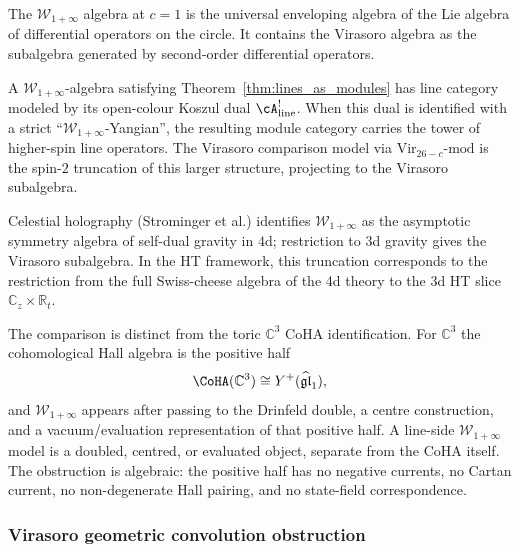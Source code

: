 \begin{remark}
\label{rem:virasoro-w-infinity}
The $\mathcal{W}_{1+\infty}$ algebra at $c = 1$ is the universal
enveloping algebra of the Lie algebra of differential operators on
the circle. It contains the Virasoro algebra as the subalgebra
generated by second-order differential operators.

A $\mathcal{W}_{1+\infty}$-algebra satisfying
Theorem~\ref{thm:lines_as_modules} has line category modeled by its
open-colour Koszul dual $\cA^!_{\mathrm{line}}$. When this dual is
identified with a strict ``$\mathcal{W}_{1+\infty}$-Yangian'', the
resulting module category carries the tower of higher-spin line
operators. The Virasoro comparison model via
$\mathrm{Vir}_{26-c}\text{-mod}$ is the spin-$2$ truncation of this
larger structure, projecting to the Virasoro subalgebra.

Celestial holography (Strominger et al.) identifies
$\mathcal{W}_{1+\infty}$ as the asymptotic symmetry algebra of
self-dual gravity in $4$d; restriction to 3d gravity gives the
Virasoro subalgebra. In the HT framework, this truncation
corresponds to the restriction from the full Swiss-cheese algebra
of the 4d theory to the 3d HT slice
$\mathbb{C}_z \times \mathbb{R}_t$.

The comparison is distinct from the toric $\mathbb C^3$ CoHA
identification. For $\mathbb C^3$ the cohomological Hall algebra is
the positive half
\[
 \CoHA(\mathbb C^3)\cong Y^+(\widehat{\mathfrak{gl}}_1),
\]
and $\mathcal W_{1+\infty}$ appears after passing to the Drinfeld
double, a centre construction, and a vacuum/evaluation representation
of that positive half. A line-side $\mathcal W_{1+\infty}$ model is a
doubled, centred, or evaluated object, separate from the CoHA itself.
The obstruction is algebraic: the positive half has no negative
currents, no Cartan current, no non-degenerate Hall pairing, and no
state-field correspondence.
\end{remark}

\subsubsection{Virasoro geometric convolution obstruction}
\label{subsubsec:virasoro-geometric}


